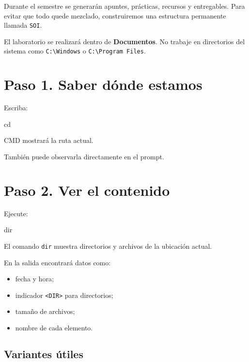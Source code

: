 \documentclass[
  spanish,
  letterpaper,
]{scrbook}
\newenvironment{Shaded}{\begin{snugshade}}{\end{snugshade}}
\newcommand{\BuiltInTok}[1]{\textcolor[rgb]{0.00,0.23,0.31}{#1}}
\providecommand{\tightlist}{%
  \setlength{\itemsep}{0pt}\setlength{\parskip}{0pt}}
\begin{document}
Durante el semestre se generarán apuntes, prácticas, recursos y
entregables. Para evitar que todo quede mezclado, construiremos una
estructura permanente llamada \texttt{SOI}.

El laboratorio se realizará dentro de \textbf{Documentos}. No trabaje en
directorios del sistema como \texttt{C:\textbackslash{}Windows} o
\texttt{C:\textbackslash{}Program\ Files}.

\section{Paso 1. Saber dónde
estamos}\label{paso-1.-saber-duxf3nde-estamos}

Escriba:

\begin{Shaded}
\begin{Highlighting}[]
\BuiltInTok{cd}
\end{Highlighting}
\end{Shaded}

CMD mostrará la ruta actual.

También puede observarla directamente en el prompt.

\section{Paso 2. Ver el contenido}\label{paso-2.-ver-el-contenido}

Ejecute:

\begin{Shaded}
\begin{Highlighting}[]
\BuiltInTok{dir}
\end{Highlighting}
\end{Shaded}

El comando \texttt{dir} muestra directorios y archivos de la ubicación
actual.

En la salida encontrará datos como:

\begin{itemize}
\tightlist
\item
  fecha y hora;
\item
  indicador \texttt{\textless{}DIR\textgreater{}} para directorios;
\item
  tamaño de archivos;
\item
  nombre de cada elemento.
\end{itemize}

\subsection{Variantes útiles}\label{variantes-uxfatiles}
\end{document}
